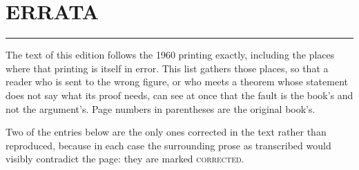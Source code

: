 \documentclass[11pt]{book}
\theoremstyle{bkplain}
\theoremstyle{XIplainnote}
\theoremstyle{bkplain}
\theoremstyle{bkplain}
\begin{document}
\chapter*{\raggedleft\Huge ERRATA}
\vspace{-1em}\noindent\rule{\linewidth}{0.6pt}\vspace{1em}

The text of this edition follows the 1960 printing exactly, including the
places where that printing is itself in error. This list gathers those
places, so that a reader who is sent to the wrong figure, or who meets a
theorem whose statement does not say what its proof needs, can see at once
that the fault is the book's and not the argument's. Page numbers in
parentheses are the original book's.

Two of the entries below are the only ones corrected in the text rather than
reproduced, because in each case the surrounding prose as transcribed would
visibly contradict the page: they are marked \textsc{corrected}.
\end{document}
